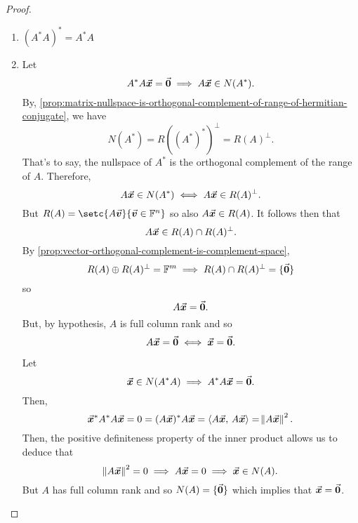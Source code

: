 \documentclass[../MathsNotesBase.tex]{subfiles}
\begin{document}
{			\bigskip
			\begin{proof}\nl
				\begin{enumerate}[label=(\roman*)]
					\item{${ (A^* A)^* = A^* A }$}
					\item{
						Let 
						\[ A^* A \vec{\bm{x}} = \vec{\bm{0}} \implies A\vec{\bm{x}} \in N(A^*). \]
						By, \autoref{prop:matrix-nullspace-is-orthogonal-complement-of-range-of-hermitian-conjugate}, we have
						\[ N(A^*) = R((A^*)^*)^\perp = R(A)^\perp. \]
						That's to say, the nullspace of $A^*$ is the orthogonal complement of the range of $A$. Therefore, 
						\[ A\vec{\bm{x}} \in N(A^*) \iff A\vec{\bm{x}} \in R(A)^\perp. \]
						But ${ R(A) = \setc{A\v}{\v \in \F{n}} }$ so also ${ A\vec{\bm{x}} \in R(A) }$. It follows then that 
						\[ A\vec{\bm{x}} \in R(A) \cap R(A)^\perp. \]
						By \autoref{prop:vector-orthogonal-complement-is-complement-space}, 
						\[ R(A) \oplus R(A)^\perp = \mathbb{F}^{m} \implies R(A) \cap R(A)^\perp = \{\vec{\bm{0}}\} \]
						so
						\[ A\vec{\bm{x}} = \vec{\bm{0}}. \]
						But, by hypothesis, $A$ is full column rank and so
						\[ A\vec{\bm{x}} = \vec{\bm{0}} \iff \vec{\bm{x}} = \vec{\bm{0}}. \]
						
						Let 
						\[ \vec{\bm{x}} \in N(A^* A) \implies A^* A \vec{\bm{x}} = \vec{\bm{0}}. \]
						Then,
						\[ \vec{\bm{x}}^* A^* A \vec{\bm{x}} = 0 = (A\vec{\bm{x}})^* A\vec{\bm{x}} = \langle A\vec{\bm{x}},\, A\vec{\bm{x}} \rangle = \norm{A\vec{\bm{x}}}^2. \]
						Then, the positive definiteness property of the inner product allows us to deduce that
						\[ \norm{A\vec{\bm{x}}}^2 = 0 \implies A\vec{\bm{x}} = 0 \implies \vec{\bm{x}} \in N(A). \]
						But $A$ has full column rank and so ${ N(A) = \{\vec{\bm{0}}\} }$ which implies that ${ \vec{\bm{x}} = \vec{\bm{0}} }$.\\
						
}
\end{enumerate}
\end{proof}}
\end{document}
